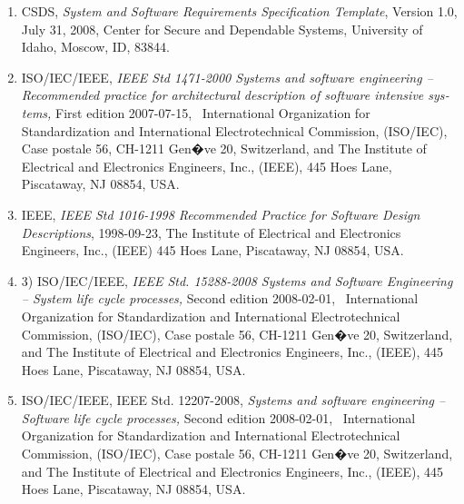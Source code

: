 \documentclass[twoside,letterpaper]{article}
\newcommand\liststyleWWviiiNumii{%
\renewcommand\theenumi{\arabic{enumi}}
\renewcommand\theenumii{\arabic{enumii}}
\renewcommand\theenumiii{\arabic{enumiii}}
\renewcommand\theenumiv{\arabic{enumiv}}
\renewcommand\labelenumi{\theenumi)}
\renewcommand\labelenumii{\theenumii.}
\renewcommand\labelenumiii{\theenumiii.}
\renewcommand\labelenumiv{\theenumiv.}
}
\begin{document}
\liststyleWWviiiNumii
\begin{enumerate}
\item {\color{black}
\foreignlanguage{english}{CSDS,
}\foreignlanguage{english}{\textit{System and Software Requirements
Specification Template}}\foreignlanguage{english}{, Version 1.0, July
31, 2008, Center for Secure and Dependable Systems, University of
Idaho, Moscow, ID, 83844.}}
\item {\color{black}
\foreignlanguage{english}{ISO/IEC/IEEE,
}\foreignlanguage{english}{\textit{IEEE Std 1471-2000 Systems and
software engineering -- Recommended practice for architectural
description of software intensive systems,}}\foreignlanguage{english}{
First edition 2007-07-15, \ International Organization for
Standardization and International Electrotechnical Commission,
(ISO/IEC), Case postale 56, CH-1211 Gen�ve 20, Switzerland, and The
Institute of Electrical and Electronics Engineers, Inc., (IEEE), 445
Hoes Lane, Piscataway, NJ 08854, USA.}}
\item {\color{black}
\foreignlanguage{english}{IEEE, }\foreignlanguage{english}{\textit{IEEE
Std 1016-1998 Recommended Practice for Software Design
Descriptions}}\foreignlanguage{english}{, 1998-09-23, The Institute of
Electrical and Electronics Engineers, Inc., (IEEE) 445 Hoes Lane,
Piscataway, NJ 08854, USA.}}
\item {\color{black}
\foreignlanguage{english}{3) ISO/IEC/IEEE,
}\foreignlanguage{english}{\textit{IEEE Std. 15288-2008 Systems and
Software Engineering -- System life cycle
processes,}}\foreignlanguage{english}{ Second edition 2008-02-01,
\ International Organization for Standardization and International
Electrotechnical Commission, (ISO/IEC), Case postale 56, CH-1211 Gen�ve
20, Switzerland, and The Institute of Electrical and Electronics
Engineers, Inc., (IEEE), 445 Hoes Lane, Piscataway, NJ 08854, USA.}}
\item {\color{black}
\foreignlanguage{english}{ISO/IEC/IEEE, IEEE Std. 12207-2008,
}\foreignlanguage{english}{\textit{Systems and software engineering --
Software life cycle processes, }}\foreignlanguage{english}{Second
edition 2008-02-01, \ International Organization for Standardization
and International Electrotechnical Commission, (ISO/IEC), Case postale
56, CH-1211 }\foreignlanguage{english}{Gen�ve 20, Switzerland, and The
Institute of Electrical and Electronics Engineers, Inc., (IEEE), 445
Hoes Lane, Piscataway, NJ 08854, USA.}}
\end{enumerate}
\end{document}
